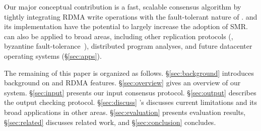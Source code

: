 Our major conceptual contribution is a fast, scalable \paxos consensus 
algorithm by tightly integrating RDMA write operations with the fault-tolerant 
nature of \paxos. \xxx and its implementation have the potential to largely 
increase the adoption of SMR. \xxx can also be applied to broad areas, 
including other replication protocols (\eg, byzantine 
fault-tolerance~\cite{zyzzyva:sosp07,pbft:osdi99}), distributed program 
analyses, and future datacenter operating systems (\S\ref{sec:apps}). 


The remaining of this paper is organized as follows. \S\ref{sec:background} 
introduces background on \paxos and RDMA features. \S\ref{sec:overview} gives 
an overview of our \xxx system. \S\ref{sec:input} presents our input consensus 
protocol. \S\ref{sec:output} describes the output checking protocol. 
\S\ref{sec:discuss} \xxx's discusses current limitations and its broad 
applications in other areas. \S\ref{sec:evaluation} presents evaluation 
results, \S\ref{sec:related} discusses related work, and \S\ref{sec:conclusion} 
concludes.   